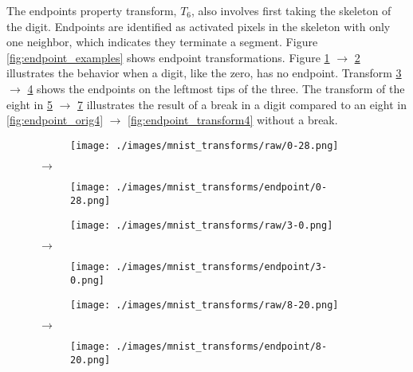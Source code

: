 The endpoints property transform, $T_6$, also involves first taking the skeleton
of the digit. Endpoints are identified as activated pixels in the skeleton with
only one neighbor, which indicates they terminate a segment. Figure
\ref{fig:endpoint_examples} shows endpoint transformations. Figure
\ref{fig:endpoint_orig1} $\rightarrow$ \ref{fig:endpoint_transform1} illustrates
the behavior when a digit, like the zero, has no endpoint. Transform
\ref{fig:endpoint_orig2} $\rightarrow$ \ref{fig:endpoint_transform2} shows the
endpoints on the leftmost tips of the three. The transform of the eight in
\ref{fig:endpoint_orig3} $\rightarrow$ \ref{fig:endpoint_transform3} illustrates
the result of a break in a digit compared to an eight in
\ref{fig:endpoint_orig4} $\rightarrow$ \ref{fig:endpoint_transform4} without a
break.

\begin{figure}[H]
    \centering

    \begin{subfigure}{.15\columnwidth}
        \centering
        \texttt{[image: ./images/mnist\_transforms/raw/0-28.png]}
        \caption{}
        \label{fig:endpoint_orig1}
    \end{subfigure}%
    $\rightarrow$
    \begin{subfigure}{.15\columnwidth}
        \centering
        \texttt{[image: ./images/mnist\_transforms/endpoint/0-28.png]}
        \caption{}
        \label{fig:endpoint_transform1}
    \end{subfigure}

    \par\medskip

    \begin{subfigure}{.15\columnwidth}
        \centering
        \texttt{[image: ./images/mnist\_transforms/raw/3-0.png]}
        \caption{}
        \label{fig:endpoint_orig2}
    \end{subfigure}%
    $\rightarrow$
    \begin{subfigure}{.15\columnwidth}
        \centering
        \texttt{[image: ./images/mnist\_transforms/endpoint/3-0.png]}
        \caption{}
        \label{fig:endpoint_transform2}
    \end{subfigure}%

    \par\medskip

    \begin{subfigure}{.15\columnwidth}
        \centering
        \texttt{[image: ./images/mnist\_transforms/raw/8-20.png]}
        \caption{}
        \label{fig:endpoint_orig3}
    \end{subfigure}%
    $\rightarrow$
    \begin{subfigure}{.15\columnwidth}
        \centering
        \texttt{[image: ./images/mnist\_transforms/endpoint/8-20.png]}
        \caption{}
        \label{fig:endpoint_transform3}
    \end{subfigure}


\end{figure}
